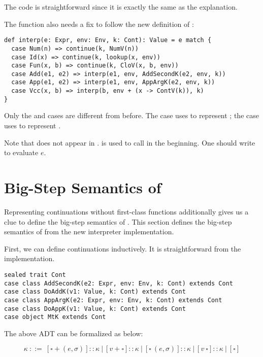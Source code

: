 The code is straightforward since it is exactly the same as the explanation.

The  function also needs a fix to follow the new definition of
:

\begin{verbatim}
def interp(e: Expr, env: Env, k: Cont): Value = e match {
  case Num(n) => continue(k, NumV(n))
  case Id(x) => continue(k, lookup(x, env))
  case Fun(x, b) => continue(k, CloV(x, b, env))
  case Add(e1, e2) => interp(e1, env, AddSecondK(e2, env, k))
  case App(e1, e2) => interp(e1, env, AppArgK(e2, env, k))
  case Vcc(x, b) => interp(b, env + (x -> ContV(k)), k)
}
\end{verbatim}

Only the  and  cases are different from before. The  case
uses  to represent ; the  case uses  to represent .

Note that  does not appear in .  is used to
call  in the beginning. One should write  to evaluate $e$.

\section{Big-Step Semantics of \lang}

Representing continuations without first-class functions additionally gives us a clue to
define the big-step semantics of \lang. This section defines
the big-step semantics of \lang from the new interpreter implementation.

First, we can define continuations inductively.
It is straightforward from the implementation.

\begin{verbatim}
sealed trait Cont
case class AddSecondK(e2: Expr, env: Env, k: Cont) extends Cont
case class DoAddK(v1: Value, k: Cont) extends Cont
case class AppArgK(e2: Expr, env: Env, k: Cont) extends Cont
case class DoAppK(v1: Value, k: Cont) extends Cont
case object MtK extends Cont
\end{verbatim}

The above ADT can be formalized as below:

\[
\kappa\ ::=\ [\square+(e,\sigma)]::\kappa
\ |\ [v+\square]::\kappa
\ |\ [\square\ (e,\sigma)]::\kappa
\ |\ [v\ \square]::\kappa
\ |\ [\square]
\]

